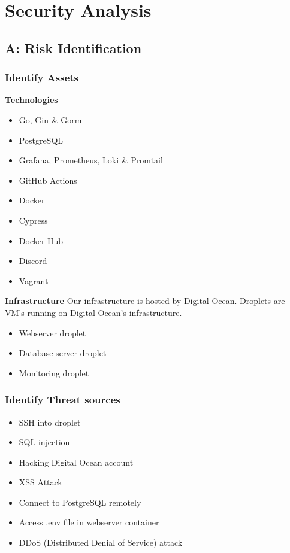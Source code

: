 \iffalse
\section*{Security Analysis}
\subsection*{A: Risk Identification}
\subsubsection*{Identify Assets}

\textbf{Technologies}
\begin{itemize}
  \item Go, Gin \& Gorm
  \item PostgreSQL
  \item Grafana, Prometheus, Loki \& Promtail
  \item GitHub Actions
  \item Docker
  \item Cypress
  \item Docker Hub
  \item Discord
  \item Vagrant
\end{itemize}

\textbf{Infrastructure}
Our infrastructure is hosted by Digital Ocean. Droplets are VM's running on Digital Ocean's infrastructure. 
\begin{itemize}
  \item Webserver droplet
  \item Database server droplet
  \item Monitoring droplet
\end{itemize}

\subsubsection*{Identify Threat sources}
\begin{itemize}
    \item SSH into droplet
    \item SQL injection
    \item Hacking Digital Ocean account
    \item XSS Attack
    \item Connect to PostgreSQL remotely
    \item Access .env file in webserver container
    \item DDoS (Distributed Denial of Service) attack 
\end{itemize}

